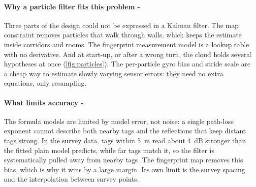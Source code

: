 \documentclass[11pt,a4paper]{article}
\begin{document}
\paragraph{Why a particle filter fits this problem -} Three parts of the design could
not be expressed in a Kalman filter. The map constraint removes particles that walk
through walls, which keeps the estimate inside corridors and rooms. The fingerprint
measurement model is a lookup table with no derivative. And at start-up, or after a
wrong turn, the cloud holds several hypotheses at once (\cref{fig:particles}). The
per-particle gyro bias and stride scale are a cheap way to estimate slowly varying
sensor errors: they need no extra equations, only resampling.

\paragraph{What limits accuracy -} The formula models are limited by model error, not
noise: a single path-loss exponent cannot describe both nearby tags and the reflections
that keep distant tags strong. In the survey data, tags within \SI{5}{m} read about
\SI{4}{dB} stronger than the fitted plain model predicts, while far tags match it, so the
filter is systematically pulled away from nearby tags. The fingerprint map removes this
bias, which is why it wins by a large margin. Its own limit is the survey spacing and the
interpolation between survey points.
\end{document}
